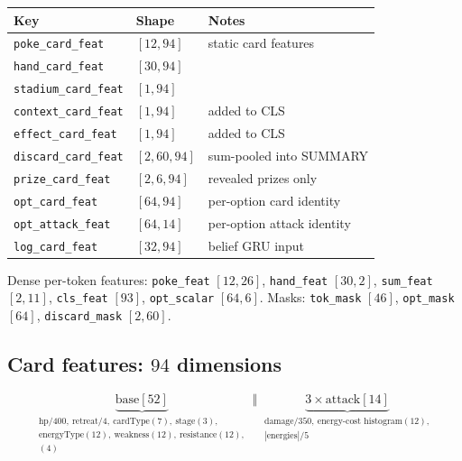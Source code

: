 \documentclass[11pt,a4paper]{article}
\newcommand{\code}[1]{\texttt{\small #1}}
\begin{document}
\begin{center}
\begin{tabular}{@{}lll@{}}
\toprule
\textbf{Key} & \textbf{Shape} & \textbf{Notes} \\
\midrule
\code{poke\_card\_feat}    & $[12, 94]$        & static card features \\
\code{hand\_card\_feat}    & $[30, 94]$        & \\
\code{stadium\_card\_feat} & $[1, 94]$         & \\
\code{context\_card\_feat} & $[1, 94]$         & added to CLS \\
\code{effect\_card\_feat}  & $[1, 94]$         & added to CLS \\
\code{discard\_card\_feat} & $[2, 60, 94]$     & sum-pooled into SUMMARY \\
\code{prize\_card\_feat}   & $[2, 6, 94]$      & revealed prizes only \\
\code{opt\_card\_feat}     & $[64, 94]$        & per-option card identity \\
\code{opt\_attack\_feat}   & $[64, 14]$        & per-option attack identity \\
\code{log\_card\_feat}     & $[32, 94]$        & belief GRU input \\
\bottomrule
\end{tabular}
\end{center}

\noindent
Dense per-token features: \code{poke\_feat} $[12,26]$, \code{hand\_feat}
$[30,2]$, \code{sum\_feat} $[2,11]$, \code{cls\_feat} $[93]$,
\code{opt\_scalar} $[64,6]$. Masks: \code{tok\_mask} $[46]$,
\code{opt\_mask} $[64]$, \code{discard\_mask} $[2,60]$.

\subsection{Card features: $94$ dimensions}

\begin{equation*}
\underbrace{\text{base}[52]}_{\substack{\text{hp}/400,\ \text{retreat}/4,\ \text{cardType}(7),\ \text{stage}(3),\\ \text{energyType}(12),\ \text{weakness}(12),\ \text{resistance}(12),\\ [\text{ex},\text{megaEx},\text{tera},\text{aceSpec}](4)}}
\;\Vert\;
\underbrace{3 \times \text{attack}[14]}_{\substack{\text{damage}/350,\ \text{energy-cost histogram}(12),\\ |\text{energies}|/5}}
\end{equation*}
\end{document}
